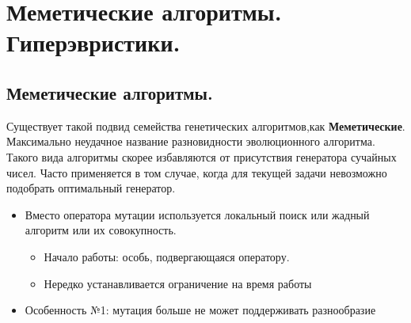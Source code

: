 \section{Меметические алгоритмы. Гиперэвристики.}
\subsection{Меметические алгоритмы.}
Существует такой подвид семейства генетических алгоритмов,как \textbf{Меметические}. Максимально неудачное название разновидности эволюционного алгоритма. Такого вида алгоритмы скорее избавляются от присутствия генератора сучайных чисел. Часто применяется в том случае, когда для текущей задачи невозможно подобрать оптимальный генератор.
\begin{itemize}
    \item Вместо оператора мутации используется локальный поиск или жадный алгоритм или их совокупность.
    \begin{itemize}
        \item Начало работы: особь, подвергающаяся оператору. 
        \item Нередко устанавливается ограничение на время работы
    \end{itemize}
    \item Особенность №1: мутация больше не может поддерживать разнообразие
    

\end{itemize}
